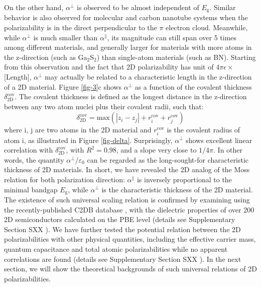 \documentclass[journal=ancac3,manuscript=article,email=true,hyperref=true,keywords=false]{achemso}
\begin{document}
On the other hand, $\alpha^{\perp}$ is observed to be almost
independent of $E_{\mathrm{g}}$. Similar behavior is also observed for
molecular \cite{T_bik_2004} and carbon nanotube \cite{Benedict_1995}
systems when the polarizability is in the direct perpendicular to the
$\pi$ electron cloud. Meanwhile, while $\alpha^{\perp}$ is much
smaller than $\alpha^{\parallel}$, its magnitude can still span over 5
times among different materials, and generally larger for materials
with more atoms in the z-direction (such as Ga$_{2}$S$_{2}$) than
single-atom materials (such as BN). Starting from this observation and
the fact that 2D polarizability has unit of
$4\pi\epsilon\times$[Length], $\alpha^{\perp}$ may actually be related
to a characteristic length in the z-direction of a 2D material. Figure
\ref{fig-3}c shows $\alpha^{\perp}$ as a function of the covalent
thickness $\delta_{\mathrm{2D}}^{\mathrm{cov}}$. The covalent
thickness is defined as the longest distance in the z-direction
between any two atom nuclei plus their covalent radii, such that:
\begin{equation}
  \label{eq:cov-thick}
  \delta_{\mathrm{2D}}^{\mathrm{cov}} = \mathrm{max}(|z_{i} - z_{j}|
  + r_{i}^{\mathrm{cov}} + r_{j}^{\mathrm{cov}})
\end{equation}
where i, j are two atoms in the 2D material and $r^{\mathrm{cov}}_{i}$
is the covalent radius of atom i, as illustrated in Figure
\ref{fig-delta}. Surprisingly, $\alpha^{\perp}$ shows excellent linear
correlation with $\delta_{\mathrm{2D}}^{\mathrm{cov}}$, with
$R^{2}=0.98$, and a slope very close to $1/4\pi$. In other words, the
quantity $\alpha^{\perp}/\varepsilon_{0}$ can be regarded as the
long-sought-for characteristic thickness of 2D materials. In short, we
have revealed the 2D analog of the Moss relation for both polarization
direction: $\alpha^{\parallel}$ is inversely proportional to the
minimal bandgap $E_{\mathrm{g}}$, while $\alpha^{\perp}$ is the
characteristic thickness of the 2D material. The existence of such
universal scaling relation is confirmed by examining using the
recently-published C2DB database \cite{Haastrup_2018}, with the
dielectric properties of over 200 2D semiconductors calculated on the
PBE level (details see Supplementary Section SXX ).  We have
further tested the potential relation between the 2D polarizabilities
with other physical quantities, including the effective carrier mass,
quantum capacitance and total atomic polarizabilities while no
apparent correlations are found (details see Supplementary Section SXX
). In the next section, we will show the theoretical
backgrounds of such universal relations of 2D polarizabilities.
\end{document}
